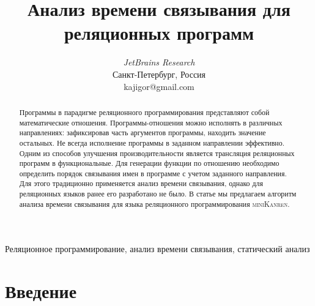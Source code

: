 \documentclass[conference,american,russian]{IEEEtran}
\begin{document}
\renewcommand{\sfdefault}{cmss}
\renewcommand{\rmdefault}{cmr}
\renewcommand{\ttdefault}{cmt}

\def\IEEEkeywordsname{Ключевые понятия}

\newcommand{\miniKanren}{\textsc{miniKanren}}
\newcommand{\mercury}{\textsc{Mercury}}
\newcommand{\haskell}{\textsc{Haskell}}
\newcommand{\prolog}{\textsc{Prolog}}
\newcommand{\scheme}{\textsc{Scheme}}
\newcommand{\logen}{\textsc{LOGEN}}

\newcommand{\github}{\textsc{GitHub}}

\lstset{mathescape=true}

\title{Анализ времени связывания для реляционных программ}

\author{
\and
{}
\textit{JetBrains Research}\\
Санкт-Петербург, Россия \\
kajigor@gmail.com}


\maketitle

\begin{abstract}
Программы в парадигме реляционного программирования представляют собой математические отношения.
Программы-отношения можно исполнять в различных направлениях: зафиксировав часть аргументов программы, находить значение остальных.
Не всегда исполнение программы в заданном направлении эффективно. 
Одним из способов улучшения производительности является трансляция реляционных программ в функциональные. 
Для генерации функции по отношению необходимо определить порядок связывания имен в программе с учетом заданного направления.
Для этого традиционно применяется анализ времени связывания, однако для реляционных языков ранее его разработано не было.
В статье мы предлагаем алгоритм анализа времени связывания для языка реляционного программирования \miniKanren{}. 
\end{abstract}

\begin{IEEEkeywords}
Реляционное программирование, анализ времени связывания, статический анализ
\end{IEEEkeywords}

\section{Введение}
\end{document}

